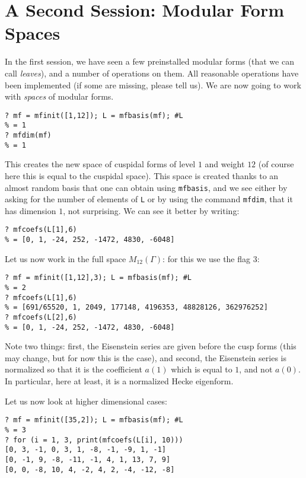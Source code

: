 \documentclass[11pt]{article}
\newcommand{\G}{\Gamma}
\def\kbd#1{{\tt #1}}
\begin{document}
\section{A Second Session: Modular Form Spaces}

In the first session, we have seen a few preinstalled modular forms (that
we can call \emph{leaves}), and a number of operations on them. All reasonable
operations have been implemented (if some are missing, please tell us). We are
now going to work with \emph{spaces} of modular forms.

\begin{verbatim}
? mf = mfinit([1,12]); L = mfbasis(mf); #L
% = 1
? mfdim(mf)
% = 1
\end{verbatim}

This creates the new space of cuspidal forms of level $1$ and weight $12$
(of course here this is equal to the cuspidal space). This space is created
thanks to an almost random basis that one can obtain using \kbd{mfbasis},
and we see either by asking for the number of elements of \kbd{L} or by
using the command \kbd{mfdim}, that it has dimension $1$, not surprising.
We can see it better by writing:

\begin{verbatim}
? mfcoefs(L[1],6)
% = [0, 1, -24, 252, -1472, 4830, -6048]
\end{verbatim}

Let us now work in the full space $M_{12}(\G)$: for this we use the flag 3:

\begin{verbatim}
? mf = mfinit([1,12],3); L = mfbasis(mf); #L
% = 2
? mfcoefs(L[1],6)
% = [691/65520, 1, 2049, 177148, 4196353, 48828126, 362976252]
? mfcoefs(L[2],6)
% = [0, 1, -24, 252, -1472, 4830, -6048]
\end{verbatim}

Note two things: first, the Eisenstein series are given before the cusp forms
(this may change, but for now this is the case), and second, the Eisenstein
series is normalized so that it is the coefficient $a(1)$ which is equal to
$1$, and not $a(0)$. In particular, here at least, it is a normalized
Hecke eigenform.

Let us now look at higher dimensional cases:

\begin{verbatim}
? mf = mfinit([35,2]); L = mfbasis(mf); #L
% = 3
? for (i = 1, 3, print(mfcoefs(L[i], 10)))
[0, 3, -1, 0, 3, 1, -8, -1, -9, 1, -1]
[0, -1, 9, -8, -11, -1, 4, 1, 13, 7, 9]
[0, 0, -8, 10, 4, -2, 4, 2, -4, -12, -8]
\end{verbatim}
\end{document}
